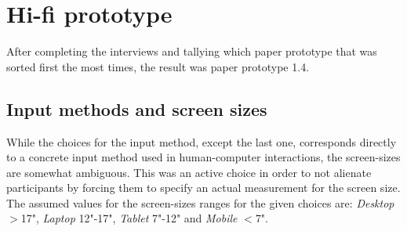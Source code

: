 \documentclass[nofilelist,dvipsnames]{cslthse-msc}
\begin{document}
{%
%
%
%
%

    \section{Hi-fi prototype}

    After completing the interviews and tallying which paper prototype that
    was sorted first the most times, the result was paper prototype 1.4.

      \subsection{Input methods and screen sizes}

       While the choices for the input
      method, except the last one, corresponds directly to a concrete input
      method used in human-computer interactions, the screen-sizes are somewhat
      ambiguous. This was an active choice in order to not alienate
      participants by forcing them to specify an actual measurement for the
      screen size. The assumed values for the screen-sizes ranges for the given
      choices are:
      \textit{Desktop} $>$17",
      \textit{Laptop}  12"-17",
      \textit{Tablet}  7"-12" and
      \textit{Mobile}  $<$7".




}
\end{document}
